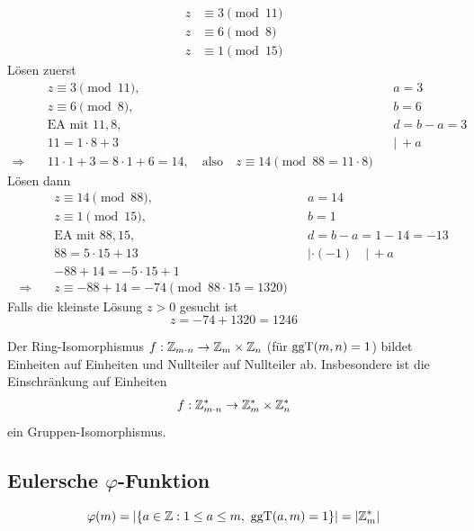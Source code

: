\begin{beispiel}
\begin{align*}
z &\equiv 3 \pmod{11} \\
z &\equiv 6 \pmod{8} \\
z &\equiv 1 \pmod{15}
\end{align*}
Lösen zuerst
\begin{align*}
&z \equiv 3 \pmod{11}, && a = 3 \\
&z \equiv 6 \pmod{8}, && b = 6 \\
&\text{EA mit } 11, 8, && d = b - a = 3 \\
&11 = 1 \cdot 8 + 3 && |\ + a \\
\Rightarrow\quad &11 \cdot 1 + 3 = 8 \cdot 1 + 6 = 14, \quad \text{also} \quad z \equiv 14 \pmod{88 = 11 \cdot 8}
\end{align*}
Lösen dann
\begin{align*}
&z \equiv 14 \pmod{88}, && a = 14 \\
&z \equiv 1 \pmod{15}, && b = 1 \\
&\text{EA mit } 88, 15, && d = b - a = 1 - 14 = -13 \\
&88 = 5 \cdot 15 + 13 && |\cdot(-1) \quad |\ + a \\
&-88 + 14 = -5 \cdot 15 + 1 \\
\Rightarrow\quad &z \equiv -88 + 14 = -74 \pmod{88 \cdot 15 = 1320}
\end{align*}
Falls die kleinste Lösung $z > 0$ gesucht ist
\[ z = -74 + 1320 = 1246 \]
\end{beispiel}

\begin{bemerkung}
Der Ring-Isomorphismus $f : \mathbb{Z}_{m \cdot n} \to \mathbb{Z}_{m} \times \mathbb{Z}_{n}$ (für $\operatorname{ggT}(m, n) = 1$) bildet Einheiten auf Einheiten und Nullteiler auf Nullteiler ab. Insbesondere ist die Einschränkung auf Einheiten
\[ f : \mathbb{Z}_{m \cdot n}^* \to \mathbb{Z}_{m}^* \times \mathbb{Z}_{n}^* \]
ein Gruppen-Isomorphismus.
\end{bemerkung}

\subsection{Eulersche $\varphi$-Funktion}

\begin{definition}
\[ \varphi(m) = |\{ a \in \mathbb{Z} : 1 \leq a \leq m,\ \operatorname{ggT}(a, m) = 1 \}| = |\mathbb{Z}_{m}^*| \]
\end{definition}

